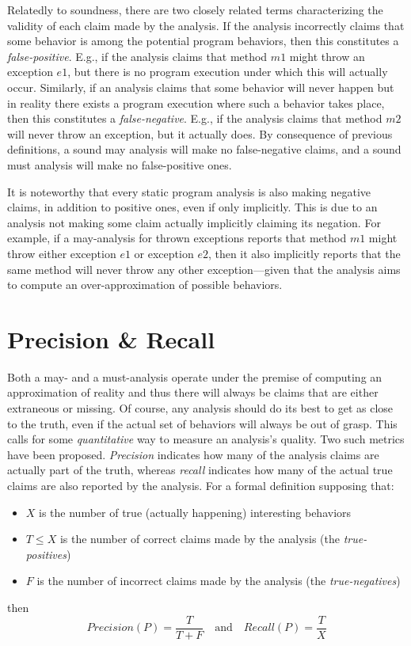 Relatedly to soundness, there are two closely related terms characterizing the validity of each claim made by the analysis. If the analysis incorrectly claims that some behavior is among the potential program behaviors, then this constitutes a \emph{false-positive}. E.g., if the analysis claims that method $m1$ might throw an exception $e1$, but there is no program execution under which this will actually occur. Similarly, if an analysis claims that some behavior will never happen but in reality there exists a program execution where such a behavior takes place, then this constitutes a \emph{false-negative}. E.g., if the analysis claims that method $m2$ will never throw an exception, but it actually does. By consequence of previous definitions, a sound may analysis will make no false-negative claims, and a sound must analysis will make no false-positive ones.

It is noteworthy that every static program analysis is also making negative claims, in addition to positive ones, even if only implicitly. This is due to an analysis not making some claim actually implicitly claiming its negation. For example, if a may-analysis for thrown exceptions reports that method $m1$ might throw either exception $e1$ or exception $e2$, then it also implicitly reports that the same method will never throw any other exception---given that the analysis aims to compute an over-approximation of possible behaviors.


\section{Precision \& Recall}
\label{sec:back:precision-recall}

Both a may- and a must-analysis operate under the premise of computing an approximation of reality and thus there will always be claims that are either extraneous or missing. Of course, any analysis should do its best to get as close to the truth, even if the actual set of behaviors will always be out of grasp. This calls for some \emph{quantitative} way to measure an analysis's quality. Two such metrics have been proposed. \emph{Precision} indicates how many of the analysis claims are actually part of the truth, whereas \emph{recall} indicates how many of the actual true claims are also reported by the analysis. For a formal definition supposing that:
\begin{itemize}
\item $X$ is the number of true (actually happening) interesting behaviors
\item $T \leq X$ is the number of correct claims made by the analysis (the \emph{true-positives})
\item $F$ is the number of incorrect claims made by the analysis (the \emph{true-negatives})
\end{itemize}
then
\[
Precision(P) = \frac{T}{T + F}
\quad \textrm{and} \quad
Recall(P) = \frac{T}{X}
\]


